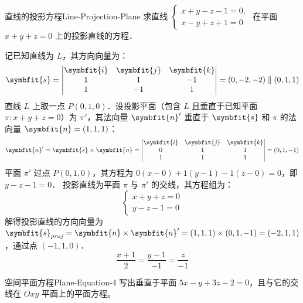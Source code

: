 \begin{problem}{直线的投影方程}{Line-Projection-Plane}
    求直线 $\begin{cases} x + y - z - 1 = 0, \\ x - y + z + 1 = 0 \end{cases}$ 在平面 $x + y + z = 0$ 上的投影直线的方程．
\end{problem}

\begin{solution}
    记已知直线为 $L$，其方向向量为：
    \begin{equation}
        \symbfit{s} = \begin{vmatrix} \symbfit{i} & \symbfit{j} & \symbfit{k} \\ 1 & 1 & -1 \\ 1 & -1 & 1 \end{vmatrix} = (0, -2, -2) \parallel (0, 1, 1)
    \end{equation}
    直线 $L$ 上取一点 $P(0, 1, 0)$．设投影平面（包含 $L$ 且垂直于已知平面 $\pi: x + y + z = 0$）为 $\pi'$，其法向量 $\symbfit{n}'$ 垂直于 $\symbfit{s}$ 和 $\pi$ 的法向量 $\symbfit{n} = (1, 1, 1)$：
    \begin{equation}
        \symbfit{n}' = \symbfit{s} \times \symbfit{n} = \begin{vmatrix} \symbfit{i} & \symbfit{j} & \symbfit{k} \\ 0 & 1 & 1 \\ 1 & 1 & 1 \end{vmatrix} = (0, 1, -1)
    \end{equation}
    平面 $\pi'$ 过点 $P(0, 1, 0)$，其方程为 $0(x - 0) + 1(y - 1) - 1(z - 0) = 0$，即 $y - z - 1 = 0$．
    投影直线为平面 $\pi$ 与 $\pi'$ 的交线，其方程组为：
    \begin{equation}
        \begin{cases} x + y + z = 0 \\ y - z - 1 = 0 \end{cases}
    \end{equation}
    解得投影直线的方向向量为 $\symbfit{s}_{proj} = \symbfit{n} \times \symbfit{n}' = (1, 1, 1) \times (0, 1, -1) = (-2, 1, 1)$，通过点 $(-1, 1, 0)$．
    \begin{equation}
        \boxed{\frac{x + 1}{2} = \frac{y - 1}{-1} = \frac{z}{-1}}
    \end{equation}
\end{solution}


\begin{problem}{空间平面方程}{Plane-Equation-4}
    写出垂直于平面 $5x - y + 3z - 2 = 0$，且与它的交线在 $Oxy$ 平面上的平面方程。
\end{problem}

